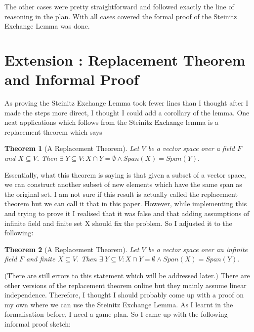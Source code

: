 \documentclass{article}
\newtheorem{Theorem}{Theorem}
\begin{document}
The other cases were pretty straightforward and followed exactly the line of reasoning in the plan. With all cases covered the formal proof of the Steinitz Exchange Lemma was done.

\section{Extension : Replacement Theorem and Informal Proof}

As proving the Steinitz Exchange Lemma took fewer lines than I thought after I made the steps more direct, I thought I could add a corollary of the lemma. One neat applications which follows from the Steinitz Exchange lemma is a replacement theorem which says

\begin{adjustwidth}{1cm}{1cm}
\begin{Theorem}[A Replacement Theorem]
    Let $V$ be a vector space over a field $F$ and $X \subseteq V$. Then \(\exists \;Y\subseteq V:X \cap Y = \emptyset \land Span(X) = Span(Y). \) 
\end{Theorem}
\end{adjustwidth}
\vspace{0.5cm}

Essentially, what this theorem is saying is that given a subset of a vector space, we can construct another subset of new elements which have the same span as the original set. I am not sure if this result is actually called the replacement theorem but we can call it that in this paper. However, while implementing this and trying to prove it I realised that it was false and that adding assumptions of infinite field and finite set X should fix the problem. So I adjusted it to the following:

\begin{adjustwidth}{1cm}{1cm}
\begin{Theorem}[A Replacement Theorem]
    Let $V$ be a vector space over an infinite field $F$ and finite $X \subseteq V$. Then \(\exists \;Y\subseteq V:X \cap Y = \emptyset \land Span(X) = Span(Y). \) 
\end{Theorem}
\end{adjustwidth}
\vspace{0.5cm}

(There are still errors to this statement which will be addressed later.) There are other versions of the replacement theorem online but they mainly assume linear independence. Therefore, I thought I should probably come up with a proof on my own where we can use the Steinitz Exchange Lemma. As I learnt in the formalisation before, I need a game plan. So I came up with the following informal proof sketch:
\end{document}
